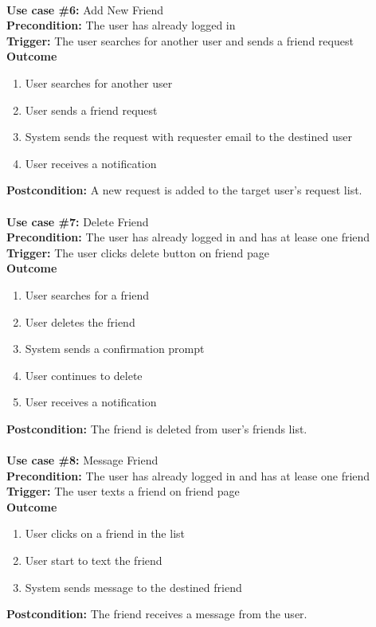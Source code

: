 \documentclass[12pt]{article}
\begin{document}
\noindent\\
\textbf{Use case \#6:} Add New Friend\\
\textbf{Precondition:} The user has already logged in\\
\textbf{Trigger:} The user searches for another user and sends a friend request\\
\textbf{Outcome}
\begin{enumerate}
	\item User searches for another user
    \item User sends a friend request
    \item System sends the request with requester email to the destined user
    \item User receives a notification
\end{enumerate}
\textbf{Postcondition:} A new request is added to the target user's request list.\\


\noindent\\
\textbf{Use case \#7:} Delete Friend\\
\textbf{Precondition:} The user has already logged in and has at lease one friend\\
\textbf{Trigger:} The user clicks delete button on friend page\\
\textbf{Outcome}
\begin{enumerate}
	\item User searches for a friend
    \item User deletes the friend
    \item System sends a confirmation prompt
    \item User continues to delete
    \item User receives a notification
\end{enumerate}
\textbf{Postcondition:} The friend is deleted from user's friends list.\\


\noindent\\
\textbf{Use case \#8:} Message Friend\\
\textbf{Precondition:} The user has already logged in and has at lease one friend\\
\textbf{Trigger:} The user texts a friend on friend page\\
\textbf{Outcome}
\begin{enumerate}
	\item User clicks on a friend in the list
    \item User start to text the friend
    \item System sends message to the destined friend
\end{enumerate}
\textbf{Postcondition:} The friend receives a message from the user.\\
\end{document}
